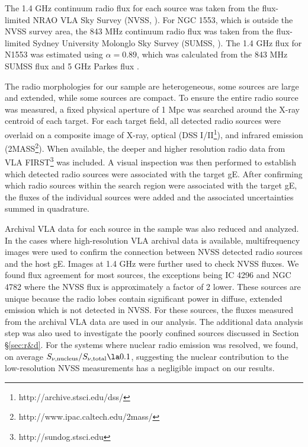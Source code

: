 \documentclass{emulateapj}
\begin{document}
The 1.4 GHz continuum radio flux for each source was taken from the
flux-limited NRAO VLA Sky Survey (NVSS, \citealt{nvss}). For NGC 1553,
which is outside the NVSS survey area, the 843 MHz continuum radio
flux was taken from the flux-limited Sydney University Molonglo Sky
Survey (SUMSS, \citealt{sumss1, sumss2}). The 1.4 GHz flux for N1553
was estimated using $\alpha = 0.89$, which was calculated from the 843
MHz SUMSS flux and 5 GHz Parkes flux \citep{1970ApL.....5...29W}.

The radio morphologies for our sample are heterogeneous, some sources
are large and extended, while some sources are compact. To ensure the
entire radio source was measured, a fixed physical aperture of 1 Mpc
was searched around the X-ray centroid of each target. For each target
field, all detected radio sources were overlaid on a composite image
of X-ray, optical (DSS I/II\footnote{http://archive.stsci.edu/dss/}),
and infrared emission
(2MASS\footnote{http://www.ipac.caltech.edu/2mass/}). When available,
the deeper and higher resolution radio data from VLA
FIRST\footnote{http://sundog.stsci.edu} was included. A visual
inspection was then performed to establish which detected radio
sources were associated with the target gE. After confirming which
radio sources within the search region were associated with the target
gE, the fluxes of the individual sources were added and the associated
uncertainties summed in quadrature.

Archival VLA data for each source in the sample was also reduced and
analyzed. In the cases where high-resolution VLA archival data is
available, multifrequency images were used to confirm the connection
between NVSS detected radio sources and the host gE. Images at 1.4 GHz
were further used to check NVSS fluxes. We found flux agreement for
most sources, the exceptions being IC 4296 and NGC 4782 where the NVSS
flux is approximately a factor of 2 lower. These sources are unique
because the radio lobes contain significant power in diffuse, extended
emission which is not detected in NVSS. For these sources, the fluxes
measured from the archival VLA data are used in our analysis. The
additional data analysis step was also used to investigate the poorly
confined sources discussed in Section \S\ref{sec:r&d}. For the systems
where nuclear radio emission was resolved, we found, on average
$S_{\nu,\mathrm{nucleus}}/S_{\nu,\mathrm{total}} \la 0.1$, suggesting
the nuclear contribution to the low-resolution NVSS measurements has a
negligible impact on our results.
\end{document}
